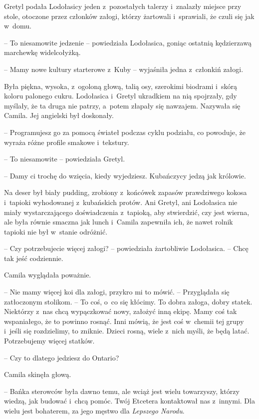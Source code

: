 \documentclass[oneside,polish,11pt,sfheadings]{mwbk}
\begin{document}
Gretyl podała Lodołasicy jeden z~pozostałych talerzy i~znalazły miejsce
przy stole, otoczone przez członków załogi, którzy żartowali i~sprawiali, że czuli się jak w~domu.

-- To niesamowite jedzenie -- powiedziała Lodołasica, goniąc ostatnią
kędzierzawą marchewkę widelcołyżką.

-- Mamy nowe kultury starterowe z~Kuby -- wyjaśniła jedna z~członkiń
załogi. 

Była piękna, wysoka, z~ogoloną głową, talią osy, szerokimi
biodrami i~skórą koloru palonego cukru. Lodołasica i~Gretyl ukradkiem na
nią spojrzały, gdy myślały, że ta druga nie patrzy, a~potem złapały się
nawzajem. Nazywała się Camila. Jej angielski był doskonały. 

-- Programujesz go za pomocą świateł podczas cyklu podziału, co powoduje,
że wyraża różne profile smakowe i~tekstury.

-- To niesamowite -- powiedziała Gretyl.

-- Damy ci trochę do wzięcia, kiedy wyjedziesz. Kubańczycy jedzą jak
królowie.

Na deser był biały pudding, zrobiony z~końcówek zapasów prawdziwego
kokosa i~tapioki wyhodowanej z~kubańskich protów. Ani Gretyl, ani
Lodołasica nie miały wystarczającego doświadczenia z~tapioką, aby
stwierdzić, czy jest wierna, ale była równie smaczna jak lunch i~Camila
zapewniła ich, że nawet rolnik tapioki nie był w~stanie odróżnić.

-- Czy potrzebujecie więcej załogi? -- powiedziała żartobliwie Lodołasica.
-- Chcę tak jeść codziennie.

Camila wyglądała poważnie. 

-- Nie mamy więcej koi dla załogi, przykro mi
to mówić. -- Przyglądała się zatłoczonym stolikom. -- To coś, o~co się
kłócimy. To dobra załoga, dobry statek. Niektórzy z~nas chcą wypączkować
nowy, założyć inną ekipę. Mamy coś tak wspaniałego, że to powinno
rosnąć. Inni mówią, że jest coś w~chemii tej grupy i~jeśli się
rozdzielimy, to zniknie. Dzieci rosną, wiele z~nich myśli, że będą
latać. Potrzebujemy więcej statków.

-- Czy to dlatego jedziesz do Ontario?

Camila skinęła głową. 

-- Bańka sterowców była dawno temu, ale wciąż jest
wielu towarzyszy, którzy wiedzą, jak budować i~chcą pomóc. Twój Etcetera
kontaktował nas z~innymi. Dla wielu jest bohaterem, za jego męstwo dla
\textit{Lepszego Narodu}.
\end{document}
